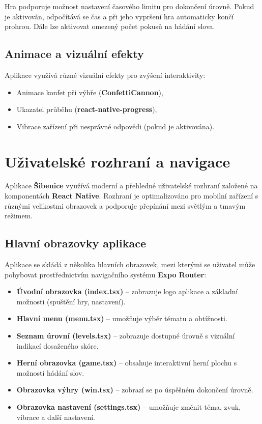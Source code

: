 \documentclass[a4paper,12pt]{article}
\begin{document}
Hra podporuje možnost nastavení časového limitu pro dokončení úrovně. Pokud je aktivován, odpočítává se čas a při jeho vypršení hra automaticky končí prohrou. Dále lze aktivovat omezený počet pokusů na hádání slova.

\subsection{Animace a vizuální efekty}

Aplikace využívá různé vizuální efekty pro zvýšení interaktivity:
\begin{itemize}
    \item Animace konfet při výhře (\textbf{ConfettiCannon}),
    \item Ukazatel průběhu (\textbf{react-native-progress}),
    \item Vibrace zařízení při nesprávné odpovědi (pokud je aktivována).
\end{itemize}

\section{Uživatelské rozhraní a navigace}

Aplikace \textbf{Šibenice} využívá moderní a přehledné uživatelské rozhraní založené na komponentách \textbf{React Native}. Rozhraní je optimalizováno pro mobilní zařízení s různými velikostmi obrazovek a podporuje přepínání mezi světlým a tmavým režimem.

\subsection{Hlavní obrazovky aplikace}

Aplikace se skládá z několika hlavních obrazovek, mezi kterými se uživatel může pohybovat prostřednictvím navigačního systému \textbf{Expo Router}:

\begin{itemize}
    \item \textbf{Úvodní obrazovka (index.tsx)} – zobrazuje logo aplikace a základní možnosti (spuštění hry, nastavení).
    \item \textbf{Hlavní menu (menu.tsx)} – umožňuje výběr tématu a obtížnosti.
    \item \textbf{Seznam úrovní (levels.tsx)} – zobrazuje dostupné úrovně s vizuální indikací dosaženého skóre.
    \item \textbf{Herní obrazovka (game.tsx)} – obsahuje interaktivní herní plochu s možností hádání slov.
    \item \textbf{Obrazovka výhry (win.tsx)} – zobrazí se po úspěšném dokončení úrovně.
    \item \textbf{Obrazovka nastavení (settings.tsx)} – umožňuje změnit téma, zvuk, vibrace a další nastavení.
\end{itemize}
\end{document}
